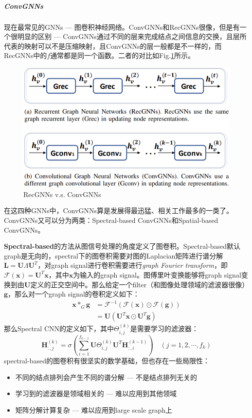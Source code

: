 \subparagraph{ConvGNNs}
现在最常见的GNNs --- 图卷积神经网络。ConvGNNs和RecGNNs很像，但是有一个很明显的区别 --- ConvGNNs通过不同的层来完成结点之间信息的交换，且层所代表的映射可以不是压缩映射，且ConvGNNs的层一般都是不一样的，而RecGNNs中的$f$通常都是同一个函数。二者的对比如Fig.\ref{fig:recgnns_convgnns}所示。
\begin{figure}[h]
	\centering
	\includegraphics[width=.8\textwidth]{pics/recgnns_convgnns.png}
	\caption{RecGNNs v.s. ConvGNNs}
	\label{fig:recgnns_convgnns}
\end{figure}

在这四种GNNs中，ConvGNNs算是发展得最迅猛、相关工作最多的一类了。ConvGNNs又可以分为两类：Spectral-based ConvGNNs和Spatial-based ConvGNNs。

\textbf{Spectral-based}的方法从图信号处理的角度定义了图卷积。Spectral-based默认graph是无向的，spectral下的图卷积需要对图的Laplacian矩阵进行谱分解$\mathbf{L}=\mathbf{U} \Lambda \mathbf{U}^{T}$，对graph signal进行卷积需要进行\textit{graph Fourier transform}，即$\mathscr{F}(\mathbf{x})=\mathbf{U}^{T} \mathbf{x}$，其中$\boldsymbol{x}$为输入的graph signal。图傅里叶变换能够将graph signal变换到由$\boldsymbol{U}$定义的正交空间中。那么给定一个filter（和图像处理领域的滤波器很像）$\boldsymbol{g}$，那么对一个graph signal的卷积定义如下：
$$
\begin{aligned}
	\mathbf{x} *_{G} \mathbf{g} &=\mathscr{F}^{-1}(\mathscr{F}(\mathbf{x}) \odot \mathscr{F}(\mathbf{g})) \\
	&=\mathbf{U}\left(\mathbf{U}^{T} \mathbf{x} \odot \mathbf{U}^{T} \mathbf{g}\right)
\end{aligned}
$$
那么Spectral CNN的定义如下，其中$\Theta_{i, j}^{(k)}$是需要学习的滤波器：
$$
\mathbf{H}_{:, j}^{(k)}=\sigma\left(\sum_{i=1}^{f_{k-1}} \mathbf{U} \Theta_{i, j}^{(k)} \mathbf{U}^{T} \mathbf{H}_{:, i}^{(k-1)}\right) \quad\left(j=1,2, \cdots, f_{k}\right)
$$
spectral-based的图卷积有很坚实的数学基础，但也存在一些局限性：
\begin{itemize}
	\item 不同的结点排列会产生不同的谱分解 --- 不是结点排列无关的
	\item 学习到的滤波器是领域相关的 --- 难以应用到其他领域
	\item 矩阵分解计算复杂 --- 难以应用到large scale graph上
\end{itemize}

